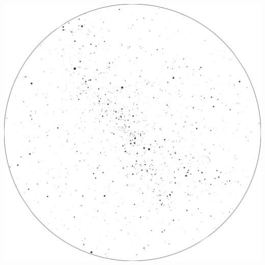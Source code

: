 \documentclass{./SAS-class-skygen}
\begin{document}
	\vspace{0.5cm}
    \begin{center}
    \includegraphics[width=\textwidth]{./pics/skychart19.png}
    \end{center}
    
    
\end{document}
